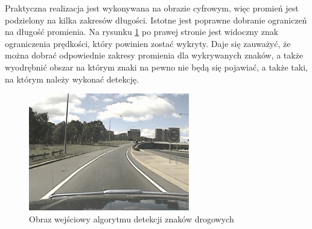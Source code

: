 Praktyczna realizacja jest wykonywana na obrazie cyfrowym, więc promień jest podzielony na kilka zakresów długości. %
Istotne jest poprawne dobranie ograniczeń na długość promienia. 
Na rysunku \ref{fig:tsd} po prawej stronie jest widoczny znak ograniczenia prędkości, który powinien zostać wykryty. 
Daje się zauważyć, że można dobrać odpowiednie zakresy promienia dla wykrywanych znaków, a także wyodrębnić obszar na którym znaki na pewno nie będą się pojawiać, a także taki, na którym należy wykonać detekcję. %
\begin{figure}
  \centering
  \includegraphics[width=7cm]{img/znaki1.png}
  \caption{Obraz wejściowy algorytmu detekcji znaków drogowych\cite{T2}}
  \label{fig:tsd}
\end{figure}


